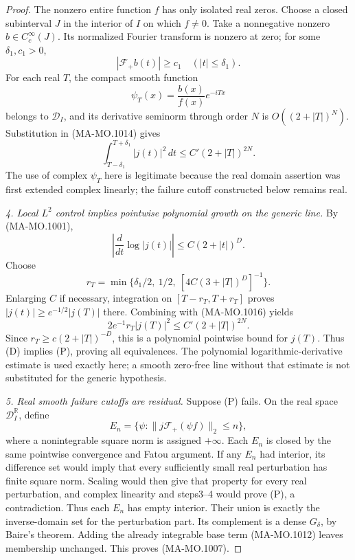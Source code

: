 \begin{proof}
The nonzero entire function \(f\) has only isolated
real zeros.  Choose a closed subinterval \(J\)
in the interior of \(I\) on which \(f\ne0\).
Take a nonnegative nonzero \(b\in C_c^\infty(J)\).
Its normalized Fourier transform is nonzero at
zero; for some \(\delta_1,c_1>0\),
\[
 |\mathcal F_+b(t)|\ge c_1\quad(|t|\le\delta_1).
\]
For each real \(T\), the compact smooth function
\[
          \psi_T(x)=\frac{b(x)}{f(x)}e^{-iTx}
\tag{MA-MO.1015}
\]
belongs to \(\mathscr D_I\), and its derivative
seminorm through order \(N\) is
\(O((2+|T|)^N)\).  Substitution in
(MA-MO.1014) gives
\[
 \int_{T-\delta_1}^{T+\delta_1}|j(t)|^2\,dt
                        \le C'(2+|T|)^{2N}.
\tag{MA-MO.1016}
\]
The use of complex \(\psi_T\) here is legitimate
because the real domain assertion was first extended
complex linearly; the failure cutoff constructed
below remains real.

\emph{4. Local \(L^2\) control implies pointwise
polynomial growth on the generic line.}
By (MA-MO.1001),
\[
 \left|\frac{d}{dt}\log|j(t)|\right|
                        \le C(2+|t|)^D.
\]
Choose
\[
 r_T=\min\{\delta_1/2,\ 1/2,\
                       [4C(3+|T|)^D]^{-1}\}.
\tag{MA-MO.1017}
\]
Enlarging \(C\) if necessary, integration on
\([T-r_T,T+r_T]\) proves
\(|j(t)|\ge e^{-1/2}|j(T)|\) there.
Combining with (MA-MO.1016) yields
\[
 2e^{-1}r_T|j(T)|^2
       \le C'(2+|T|)^{2N}.
\tag{MA-MO.1018}
\]
Since \(r_T\ge c(2+|T|)^{-D}\), this is a
polynomial pointwise bound for \(j(T)\).
Thus (D) implies (P), proving all equivalences.
The polynomial logarithmic-derivative estimate is
used exactly here; a smooth zero-free line without
that estimate is not substituted for the generic
hypothesis.

\emph{5. Real smooth failure cutoffs are residual.}
Suppose (P) fails.  On the real space
\(\mathscr D_I^\mathbb R\), define
\[
 E_n=\{\psi:
       \|j\mathcal F_+(\psi f)\|_2\le n\},
\tag{MA-MO.1019}
\]
where a nonintegrable square norm is assigned
\(+\infty\).  Each \(E_n\) is closed by the
same pointwise convergence and Fatou argument.
If any \(E_n\) had interior, its difference set
would imply that every sufficiently small real
perturbation has finite square norm.  Scaling
would then give that property for every real
perturbation, and complex linearity and
steps3--4 would prove (P), a contradiction.
Thus each \(E_n\) has empty interior.
Their union is exactly the inverse-domain set
for the perturbation part.  Its complement is
a dense \(G_\delta\), by Baire's theorem.
Adding the already integrable base term
(MA-MO.1012) leaves membership unchanged.
This proves (MA-MO.1007).


\end{proof}
